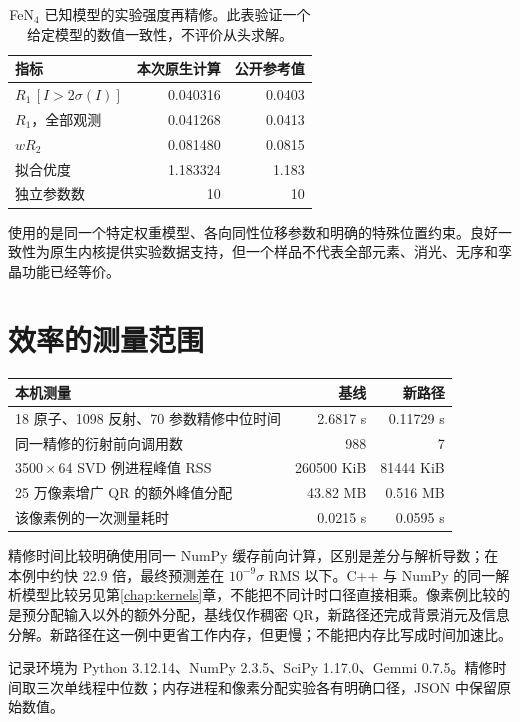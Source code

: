 \begin{table}[tb]
\centering
\caption{FeN$_4$ 已知模型的实验强度再精修。此表验证一个给定模型的数值一致性，不评价从头求解。}
\begin{tabular}{@{}lrr@{}}
\toprule 指标 & 本次原生计算 & 公开参考值\\\midrule
$R_1\,[I>2\sigma(I)]$ & 0.040316 & 0.0403\\
$R_1$，全部观测 & 0.041268 & 0.0413\\
$wR_2$ & 0.081480 & 0.0815\\
拟合优度 & 1.183324 & 1.183\\
独立参数数 & 10 & 10\\
\bottomrule
\end{tabular}
\end{table}

使用的是同一个特定权重模型、各向同性位移参数和明确的特殊位置约束。良好一致性为原生内核提供实验数据支持，但一个样品不代表全部元素、消光、无序和孪晶功能已经等价。

\section{效率的测量范围}
\begin{table}[tb]
\centering\small
\begin{tabularx}{\textwidth}{@{}Xrr@{}}
\toprule 本机测量 & 基线 & 新路径\\\midrule
18 原子、1098 反射、70 参数精修中位时间 & 2.6817 s & 0.11729 s\\
同一精修的衍射前向调用数 & 988 & 7\\
3500\,$\times$\,64 SVD 例进程峰值 RSS & 260500 KiB & 81444 KiB\\
25 万像素增广 QR 的额外峰值分配 & 43.82 MB & 0.516 MB\\
该像素例的一次测量耗时 & 0.0215 s & 0.0595 s\\
\bottomrule
\end{tabularx}
\end{table}

精修时间比较明确使用同一 NumPy 缓存前向计算，区别是差分与解析导数；在本例中约快 22.9 倍，最终预测差在 $10^{-9}\sigma$ RMS 以下。C++ 与 NumPy 的同一解析模型比较另见第\ref{chap:kernels}章，不能把不同计时口径直接相乘。像素例比较的是预分配输入以外的额外分配，基线仅作稠密 QR，新路径还完成背景消元及信息分解。新路径在这一例中更省工作内存，但更慢；不能把内存比写成时间加速比。

记录环境为 Python 3.12.14、NumPy 2.3.5、SciPy 1.17.0、Gemmi 0.7.5。精修时间取三次单线程中位数；内存进程和像素分配实验各有明确口径，JSON 中保留原始数值。

